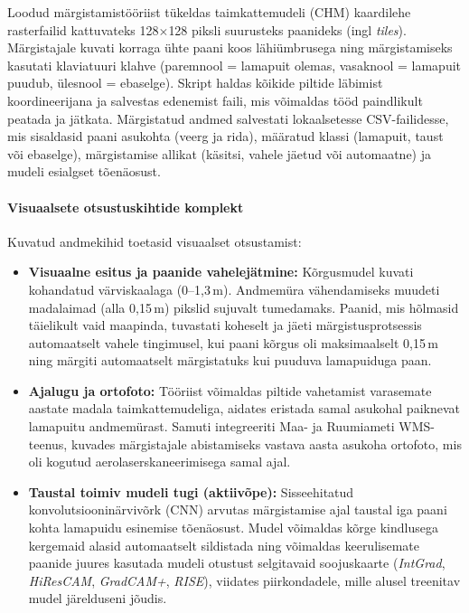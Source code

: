     Loodud märgistamistööriist tükeldas taimkattemudeli (CHM) kaardilehe rasterfailid kattuvateks 128$\times$128 piksli suurusteks paanideks (ingl \textit{tiles}). Märgistajale kuvati korraga ühte paani koos lähiümbrusega ning märgistamiseks kasutati klaviatuuri klahve (paremnool = lamapuit olemas, vasaknool = lamapuit puudub, ülesnool = ebaselge). Skript haldas kõikide piltide läbimist koordineerijana ja salvestas edenemist faili, mis võimaldas tööd paindlikult peatada ja jätkata. Märgistatud andmed salvestati lokaalsetesse CSV-failidesse, mis sisaldasid paani asukohta (veerg ja rida), määratud klassi (lamapuit, taust või ebaselge), märgistamise allikat (käsitsi, vahele jäetud või automaatne) ja mudeli esialgset tõenäosust.

    \paragraph{Visuaalsete otsustuskihtide komplekt} Kuvatud andmekihid toetasid visuaalset otsustamist:
    \begin{itemize}
        \item \textbf{Visuaalne esitus ja paanide vahelejätmine:} Kõrgusmudel kuvati kohandatud värviskaalaga (0--1,3\,m). Andmemüra vähendamiseks muudeti madalaimad (alla 0,15\,m) pikslid sujuvalt tumedamaks. Paanid, mis hõlmasid täielikult vaid maapinda, tuvastati koheselt ja jäeti märgistusprotsessis automaatselt vahele tingimusel, kui paani kõrgus oli maksimaalselt 0,15\,m ning märgiti automaatselt märgistatuks kui puuduva lamapuiduga paan.
        \item \textbf{Ajalugu ja ortofoto:} Tööriist võimaldas piltide vahetamist varasemate aastate madala taimkattemudeliga, aidates eristada samal asukohal paiknevat lamapuitu andmemürast. Samuti integreeriti Maa- ja Ruumiameti WMS-teenus, kuvades märgistajale abistamiseks vastava aasta asukoha ortofoto, mis oli kogutud aerolaserskaneerimisega samal ajal.
        \item \textbf{Taustal toimiv mudeli tugi (aktiivõpe):} Sisseehitatud konvolutsiooninärvivõrk (CNN) arvutas märgistamise ajal taustal iga paani kohta lamapuidu esinemise tõenäosust. Mudel võimaldas kõrge kindlusega kergemaid alasid automaatselt sildistada ning võimaldas keerulisemate paanide juures kasutada mudeli otustust selgitavaid soojuskaarte (\textit{IntGrad}, \textit{HiResCAM}, \textit{GradCAM+}, \textit{RISE}), viidates piirkondadele, mille alusel treenitav mudel järelduseni jõudis.
    \end{itemize}

